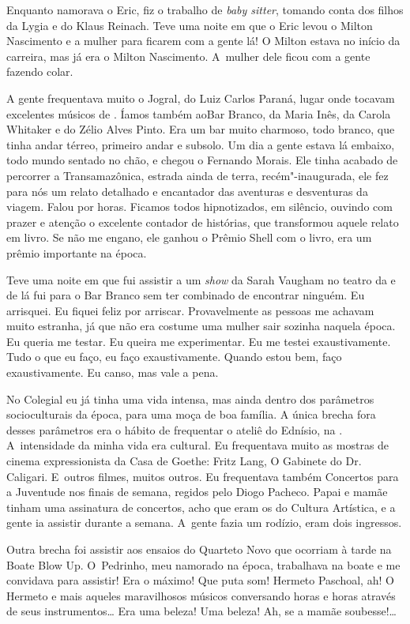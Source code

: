 Enquanto namorava o Eric, fiz o trabalho de \emph{baby sitter}, tomando
conta dos filhos da Lygia e do Klaus Reinach. Teve uma noite em que o
Eric levou o Milton Nascimento e a mulher para ficarem com a gente lá! O
Milton estava no início da carreira, mas já era o Milton Nascimento. A~mulher dele ficou com a gente fazendo colar.

A gente frequentava muito o Jogral, do Luiz Carlos Paraná, lugar onde
tocavam excelentes músicos de . Íamos também aoBar Branco, da Maria
Inês, da Carola Whitaker e do Zélio Alves Pinto. Era um bar muito
charmoso, todo branco, que tinha andar térreo, primeiro andar e subsolo.
Um dia a gente estava lá embaixo, todo mundo sentado no chão, e chegou o
Fernando Morais. Ele tinha acabado de percorrer a Transamazônica,
estrada ainda de terra, recém"-inaugurada, ele fez para nós um relato
detalhado e encantador das aventuras e desventuras da viagem. Falou por
horas. Ficamos todos hipnotizados, em silêncio, ouvindo com prazer e
atenção o excelente contador de histórias, que transformou aquele relato
em livro. Se não me engano, ele ganhou o Prêmio Shell com o livro, era
um prêmio importante na época.

Teve uma noite em que fui assistir a um \emph{show} da Sarah Vaugham no
teatro da  e de lá fui para o Bar Branco sem ter combinado de
encontrar ninguém. Eu arrisquei. Eu fiquei feliz por arriscar.
Provavelmente as pessoas me achavam muito estranha, já que não era
costume uma mulher sair sozinha naquela época. Eu queria me testar. Eu
queira me experimentar. Eu me testei exaustivamente. Tudo o que eu faço,
eu faço exaustivamente. Quando estou bem, faço exaustivamente. Eu canso,
mas vale a pena.

No Colegial eu já tinha uma vida intensa, mas ainda dentro dos
parâmetros socioculturais da época, para uma moça de boa família. A
única brecha fora desses parâmetros era o hábito de frequentar o ateliê
do Ednísio, na . A~intensidade da minha vida era cultural. Eu
frequentava muito as mostras de cinema expressionista da Casa de Goethe:
Fritz Lang, O Gabinete do Dr. Caligari. E~outros filmes, muitos outros.
Eu frequentava também Concertos para a Juventude nos finais de semana,
regidos pelo Diogo Pacheco. Papai e mamãe tinham uma assinatura de
concertos, acho que eram os do Cultura Artística, e a gente ia assistir
durante a semana. A~gente fazia um rodízio, eram dois ingressos.

Outra brecha foi assistir aos ensaios do Quarteto Novo que ocorriam à
tarde na Boate Blow Up. O~Pedrinho, meu namorado na época, trabalhava na
boate e me convidava para assistir! Era o máximo! Que puta som! Hermeto
Paschoal, ah! O Hermeto e mais aqueles maravilhosos músicos conversando
horas e horas através de seus instrumentos… Era uma beleza! Uma
beleza! Ah, se a mamãe soubesse!…

